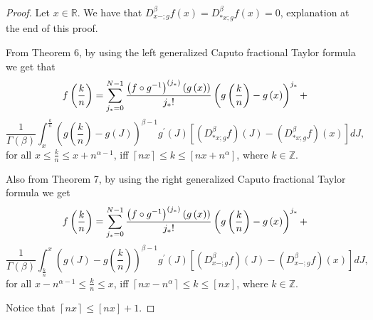 \documentclass[10pt]{NSP1}
\numberwithin{equation}{section}
\begin{document}
\begin{proof}
Let $x\in \mathbb{R}$. We have that $D_{x-;g}^{\beta }f\left( x\right)
=D_{\ast x;g}^{\beta }f\left( x\right) =0$, explanation at the end of this
proof.

From Theorem 6, by using the left generalized Caputo fractional Taylor
formula we get that
\begin{equation*}
f\left( \frac{k}{n}\right) =\sum_{j_{\ast }=0}^{N-1}\frac{\left( f\circ
g^{-1}\right) ^{\left( j_{\ast }\right) }\left( g\left( x\right) \right) }{%
j_{\ast }!}\left( g\left( \frac{k}{n}\right) -g\left( x\right) \right)
^{j_{\ast }}+
\end{equation*}
\begin{equation}
\frac{1}{\Gamma \left( \beta \right) }\int_{x}^{\frac{k}{n}}\left( g\left(
\frac{k}{n}\right) -g\left( J\right) \right) ^{\beta -1}g^{\prime }\left(
J\right) \left[ \left( D_{\ast x;g}^{\beta }f\right) \left( J\right) -\left(
D_{\ast x;g}^{\beta }f\right) \left( x\right) \right] dJ,  \tag{26}
\label{26}
\end{equation}
for all $x\leq \frac{k}{n}\leq x+n^{\alpha -1}$, iff $\left\lceil
nx\right\rceil \leq k\leq \left[ nx+n^{\alpha }\right] $, where $k\in
\mathbb{Z}.$

Also from Theorem 7, by using the right generalized Caputo fractional Taylor
formula we get
\begin{equation*}
f\left( \frac{k}{n}\right) =\sum_{j_{\ast }=0}^{N-1}\frac{\left( f\circ
g^{-1}\right) ^{\left( j_{\ast }\right) }\left( g\left( x\right) \right) }{%
j_{\ast }!}\left( g\left( \frac{k}{n}\right) -g\left( x\right) \right)
^{j_{\ast }}+
\end{equation*}
\begin{equation}
\frac{1}{\Gamma \left( \beta \right) }\int_{\frac{k}{n}}^{x}\left( g\left(
J\right) -g\left( \frac{k}{n}\right) \right) ^{\beta -1}g^{\prime }\left(
J\right) \left[ \left( D_{x-;g}^{\beta }f\right) \left( J\right) -\left(
D_{x-;g}^{\beta }f\right) \left( x\right) \right] dJ,  \tag{27}  \label{27}
\end{equation}
for all $x-n^{\alpha -1}\leq \frac{k}{n}\leq x$, iff $\left\lceil
nx-n^{\alpha }\right\rceil \leq k\leq \left[ nx\right] $, where $k\in
\mathbb{Z}.$

Notice that $\left \lceil nx\right \rceil \leq \left[ nx\right] +1.$


\end{proof}
\end{document}
